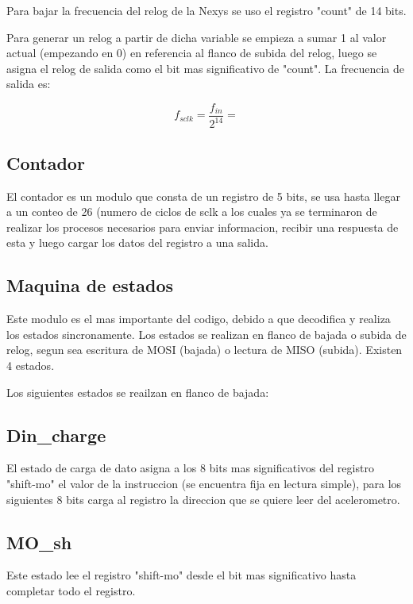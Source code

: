 \documentclass{article}
\begin{document}
Para bajar la frecuencia del relog de la Nexys se uso el registro "count" de 14 bits.

Para generar un relog a partir de dicha variable se empieza a sumar 1 al valor actual (empezando en 0) en referencia al flanco de subida del relog, luego se asigna el relog de salida como el bit mas significativo de "count". La frecuencia de salida es:

\begin{center}
    \[ f_{sclk}=\frac{f_{in}}{2^{14}}=\]
\end{center}

\subsection{Contador}

El contador es un modulo que consta de un registro de 5 bits, se usa hasta llegar a un conteo de 26 (numero de ciclos de sclk a los cuales ya se terminaron de realizar los procesos necesarios para enviar informacion, recibir una respuesta de esta y luego cargar los datos del registro a una salida.

\subsection{Maquina de estados}

Este modulo es el mas importante del codigo, debido a que decodifica y realiza los estados sincronamente. Los estados se realizan en flanco de bajada o subida de relog, segun sea escritura de MOSI (bajada) o lectura de MISO (subida). Existen 4 estados.

Los siguientes estados se reailzan en flanco de bajada:

\subsection{Din_charge}

El estado de carga de dato asigna a los 8 bits mas significativos del registro "shift-mo" el valor de la instruccion (se encuentra fija en lectura simple), para los siguientes 8 bits carga al registro la direccion que se quiere leer del acelerometro.

\subsection{MO_sh}

Este estado lee el registro "shift-mo" desde el bit mas significativo hasta completar todo el registro.
\end{document}
